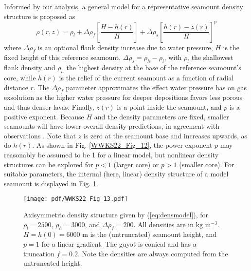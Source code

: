 Informed by our analysis, a general model for a representative seamount density structure is proposed as
\begin{equation}
\rho(r,z) = \rho_l + \Delta \rho_f \left [\frac{H-h(r)}{H}\right ] + \Delta \rho_s \left [ \frac{h(r)-z(r)}{H} \right ]^p
\label{eq:densmodel}
\end{equation}
where $\Delta \rho_f$ is an optional flank density increase due to water pressure, $H$ is the fixed height
of this reference seamount, $\Delta \rho_s = \rho_h - \rho_l$, with $\rho_l$ the shallowest flank density and
$\rho_h$ the highest density at the base of the reference seamount's core, while $h(r)$ is the relief of
the current seamount as a function of radial distance $r$. The $\Delta \rho_f$ parameter approximates the effect
water pressure has on gas exsolution as the higher water pressure for deeper depositions favors less
porous and thus denser lavas.  Finally, $z(r)$ is a point inside the seamount, and $p$ is a
positive exponent.  Because $H$ and the density parameters are fixed, smaller seamounts will have lower overall
density predictions, in agreement with observations \citep{H1991}. Note that $z$ is zero at the seamount base and increases
upwards, as do $h(r)$. As shown in Fig. \ref{WWKS22_Fig_12},
the power exponent $p$ may reasonably be assumed to be 1 for a linear model, but nonlinear density structures
can be explored for $p < 1$ (larger core) or $p > 1$ (smaller core). For suitable parameters, the internal (here, linear)
density structure of a model seamount is displayed in Fig. \ref{WWKS22_Fig_13}.

\begin{figure}
\centering
\texttt{[image: pdf/WWKS22\_Fig\_13.pdf]}
\caption{Axisymmetric density structure given by (\ref{eq:densmodel}), for $\rho_l = 2500$, $\rho_h = 3000$,
and $\Delta \rho_f = 200$. All densities are in kg m$^{-3}$. $H = h(0) = 6000$ m is the (untruncated) seamount height,
and $p = 1$ for a linear gradient. The guyot is conical and has a truncation $f = 0.2$.  Note the densities are
always computed from the untruncated height.}
\label{WWKS22_Fig_13}
\end{figure}

